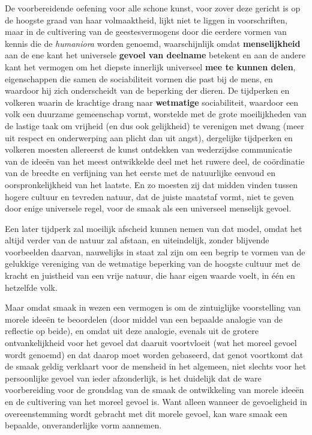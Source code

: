 De voorbereidende oefening voor alle schone kunst, voor zover deze gericht is op de hoogste graad van haar volmaaktheid, lijkt niet te liggen in voorschriften, maar in de cultivering van de geestesvermogens door die eerdere vormen van kennis die de \textit{humaniora} worden genoemd, waarschijnlijk omdat \textbf{menselijkheid} aan de ene kant het universele \textbf{gevoel van deelname} betekent en aan de andere kant het vermogen om het diepste innerlijk universeel \textbf{mee te kunnen delen}, eigenschappen die samen de sociabiliteit vormen die past bij de mens, en waardoor hij zich onderscheidt van de beperking der dieren. De tijdperken en volkeren waarin de krachtige drang naar \textbf{wetmatige} sociabiliteit, waardoor een volk een duurzame gemeenschap vormt, worstelde met de grote moeilijkheden van de lastige taak om vrijheid (en dus ook gelijkheid) te verenigen met dwang (meer uit respect en onderwerping aan plicht dan uit angst), dergelijke tijdperken en volkeren moesten allereerst de kunst ontdekken van wederzijdse communicatie van de ideeën van het meest ontwikkelde deel met het ruwere deel, de coördinatie van de breedte en verfijning van het eerste met de natuurlijke eenvoud en oorspronkelijkheid van het laatste. En zo moesten zij dat midden vinden tussen hogere cultuur en tevreden natuur, dat de juiste maatstaf vormt, niet te geven door enige universele regel, voor de smaak als een universeel menselijk gevoel.

Een later tijdperk zal moeilijk afscheid kunnen nemen van dat model, omdat het altijd verder van de natuur zal afstaan, en uiteindelijk, zonder blijvende voorbeelden daarvan, nauwelijks in staat zal zijn om een begrip te vormen van de gelukkige vereniging van de wetmatige beperking van de hoogste cultuur met de kracht en juistheid van een vrije natuur, die haar eigen waarde voelt, in één en hetzelfde volk.

Maar omdat smaak in wezen een vermogen is om de zintuiglijke voorstelling van morele ideeën te beoordelen (door middel van een bepaalde analogie van de reflectie op beide), en omdat uit deze analogie, evenals uit de grotere ontvankelijkheid voor het gevoel dat daaruit voortvloeit (wat het moreel gevoel wordt genoemd) en dat daarop moet worden gebaseerd, dat genot voortkomt dat de smaak geldig verklaart voor de mensheid in het algemeen, niet slechts voor het persoonlijke gevoel van ieder afzonderlijk, is het duidelijk dat de ware voorbereiding voor de grondslag van de smaak de ontwikkeling van morele ideeën en de cultivering van het moreel gevoel is. Want alleen wanneer de gevoeligheid in overeenstemming wordt gebracht met dit morele gevoel, kan ware smaak een bepaalde, onveranderlijke vorm aannemen.

